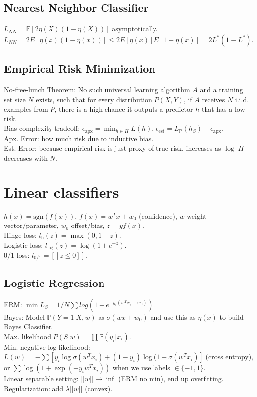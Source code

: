 \subsection*{Nearest Neighbor Classifier}

$L_{NN} = \mathbb{E}[2\eta(X)(1-\eta(X))]$ asymptotically.\\
$L_{NN} = 2E[\eta(x)(1-\eta(x))] \leq 2E[\eta(x)]E[1-\eta(x)] = 2L^*(1-L^*)$.

\subsection*{Empirical Risk Minimization}

No-free-lunch Theorem: No such universal learning algorithm $A$ and a training set size $N$ exists, such that for every distribution $P(X,Y)$, if $A$ receives $N$ i.i.d. examples from $P$, there is a high chance it outputs a predictor $h$ that has a low risk.\\
Bias-complexity tradeoff: $\epsilon_{\text{apx}} = \min_{h \in H}L(h)$, $\epsilon_{\text{est}} = L_\mathbb{P}(h_S) - \epsilon_{\text{apx}}$.\\
Apx. Error: how much risk due to inductive bias.\\
Est. Error: because empirical risk is just proxy of true risk, increases as $\log |H|$ decreases with $N$.

\section{Linear classifiers}

$h(x) = \text{sgn}(f(x))$, $f(x) = w^T x + w_0$ (confidence), $w$ weight vector/parameter, $w_0$ offset/bias, $z = yf(x)$.\\
Hinge loss: $l_{\text{h}}(z) = \max(0, 1-z)$.\\
Logistic loss: $l_{\log}(z) = \log(1+e^{-z})$.\\
0/1 loss: $l_{\text{0/1}} = [[z \leq 0]]$.

\subsection*{Logistic Regression}

ERM: $\min L_S = 1/N \sum log(1+e^{-y_i(w^T x_i + w_0)})$.\\
Bayes: Model $\mathbb{P}(Y=1|X, w)$ as $\sigma(w x +w_0)$ and use this as $\eta(x)$ to build Bayes Classifier.\\
Max. likelihood $P(S|w) = \prod \mathbb{P}(y_i|x_i)$.\\
Min. negative log-likelihood: $L(w) = -\sum[y_i \log \sigma(w^T x_i) + (1 - y_i) \log(1 - \sigma(w^T x_i)]$ (cross entropy), or $\sum \log(1 + \exp(-y_i w^T x_i))$ when we use labels $\in \{-1, 1\}$.\\
Linear separable setting: $||w|| \rightarrow \inf$ (ERM no min), end up overfitting.\\
Regularization: add $\lambda ||w||$ (convex).

